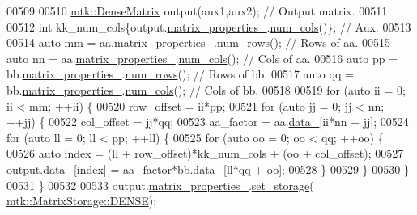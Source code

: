 \begin{DoxyCode}
00509 
00510   \hyperlink{classmtk_1_1DenseMatrix}{mtk::DenseMatrix} output(aux1,aux2); \textcolor{comment}{// Output matrix.}
00511 
00512   \textcolor{keywordtype}{int} kk\_num\_cols\{output.\hyperlink{classmtk_1_1DenseMatrix_a481c8d09af685a5ba67acefdcaa810cc}{matrix\_properties\_}.\hyperlink{classmtk_1_1Matrix_a2160118d0edf51cf2aaa806ee1b915f8}{num\_cols}()\}; \textcolor{comment}{// Aux.}
00513 
00514   \textcolor{keyword}{auto} mm = aa.\hyperlink{classmtk_1_1DenseMatrix_a481c8d09af685a5ba67acefdcaa810cc}{matrix\_properties\_}.\hyperlink{classmtk_1_1Matrix_ab308b25b48e4fcd39fc60e0c3fc66dea}{num\_rows}(); \textcolor{comment}{// Rows of aa.}
00515   \textcolor{keyword}{auto} nn = aa.\hyperlink{classmtk_1_1DenseMatrix_a481c8d09af685a5ba67acefdcaa810cc}{matrix\_properties\_}.\hyperlink{classmtk_1_1Matrix_a2160118d0edf51cf2aaa806ee1b915f8}{num\_cols}(); \textcolor{comment}{// Cols of aa.}
00516   \textcolor{keyword}{auto} pp = bb.\hyperlink{classmtk_1_1DenseMatrix_a481c8d09af685a5ba67acefdcaa810cc}{matrix\_properties\_}.\hyperlink{classmtk_1_1Matrix_ab308b25b48e4fcd39fc60e0c3fc66dea}{num\_rows}(); \textcolor{comment}{// Rows of bb.}
00517   \textcolor{keyword}{auto} qq = bb.\hyperlink{classmtk_1_1DenseMatrix_a481c8d09af685a5ba67acefdcaa810cc}{matrix\_properties\_}.\hyperlink{classmtk_1_1Matrix_a2160118d0edf51cf2aaa806ee1b915f8}{num\_cols}(); \textcolor{comment}{// Cols of bb.}
00518 
00519   \textcolor{keywordflow}{for} (\textcolor{keyword}{auto} ii = 0; ii < mm; ++ii) \{
00520     row\_offset = ii*pp;
00521     \textcolor{keywordflow}{for} (\textcolor{keyword}{auto} jj = 0; jj < nn; ++jj) \{
00522       col\_offset = jj*qq;
00523       aa\_factor = aa.\hyperlink{classmtk_1_1DenseMatrix_a7893e4e5c8d2e2de32b156177e78cb6f}{data\_}[ii*nn + jj];
00524       \textcolor{keywordflow}{for} (\textcolor{keyword}{auto} ll = 0; ll < pp; ++ll) \{
00525         \textcolor{keywordflow}{for} (\textcolor{keyword}{auto} oo = 0; oo < qq; ++oo) \{
00526           \textcolor{keyword}{auto} index = (ll + row\_offset)*kk\_num\_cols + (oo + col\_offset);
00527           output.\hyperlink{classmtk_1_1DenseMatrix_a7893e4e5c8d2e2de32b156177e78cb6f}{data\_}[index] = aa\_factor*bb.\hyperlink{classmtk_1_1DenseMatrix_a7893e4e5c8d2e2de32b156177e78cb6f}{data\_}[ll*qq + oo];
00528         \}
00529       \}
00530     \}
00531   \}
00532 
00533   output.\hyperlink{classmtk_1_1DenseMatrix_a481c8d09af685a5ba67acefdcaa810cc}{matrix\_properties\_}.\hyperlink{classmtk_1_1Matrix_a111b89f2f21d06a59b8d043123bec625}{set\_storage}(
      \hyperlink{namespacemtk_ga25b67ec6a2afeee69f9bb196a9c66619a0706fbbd929bd8abc4de386c53d439ff}{mtk::MatrixStorage::DENSE});

\end{DoxyCode}
